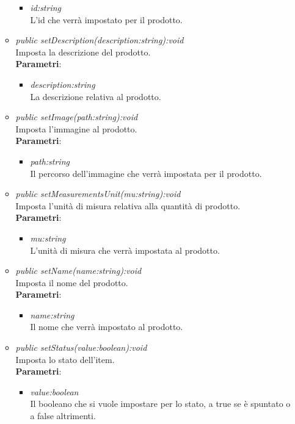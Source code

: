 \begin{itemize}
\begin{itemize}
\begin{itemize}
				\item \textit{id:string}\\
						L'id che verrà impostato per il prodotto.
			\end{itemize} 
	\item \textit{public setDescription(description:string):void}\\
	Imposta la descrizione del prodotto.
				\\ \textbf{Parametri}: \begin{itemize}
				\item \textit{description:string}\\
				La descrizione relativa al prodotto.
			\end{itemize} 
	\item \textit{public setImage(path:string):void}\\
	Imposta l'immagine al prodotto.
				\\ \textbf{Parametri}: \begin{itemize}
				\item \textit{path:string}\\
				Il percorso dell'immagine che verrà impostata per il prodotto.
			\end{itemize} 
	\item \textit{public setMeasurementsUnit(mu:string):void}\\
	Imposta l'unità di misura relativa alla quantità di prodotto.
				\\ \textbf{Parametri}: \begin{itemize}
				\item \textit{mu:string}\\
				L'unità di misura che verrà impostata al prodotto.
			\end{itemize} 
	\item \textit{public setName(name:string):void}\\
	Imposta il nome del prodotto.
				\\ \textbf{Parametri}: \begin{itemize}
				\item \textit{name:string}\\
				Il nome che verrà impostato al prodotto.
			\end{itemize} 
	\item \textit{public setStatus(value:boolean):void}\\
	Imposta lo stato dell'item.
				\\ \textbf{Parametri}: \begin{itemize}
				\item \textit{value:boolean}\\
				Il booleano che si vuole impostare per lo stato, a true se è spuntato o a false altrimenti.
			\end{itemize} 


\end{itemize}
\end{itemize}
